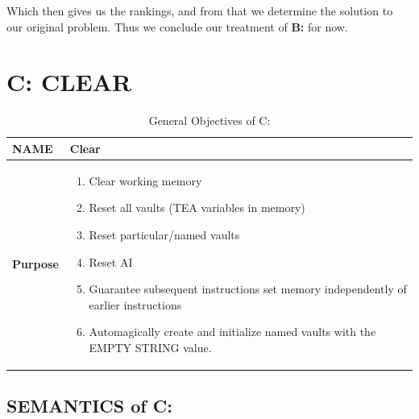 \documentclass[a4paper, 18pt]{book} %
\begin{document}
Which then gives us the rankings, and from that we determine the solution to our original problem. Thus we conclude our treatment of \textbf{B:} for now.


\chapter{C: CLEAR}
\label{CHAPC}


\begin{table}[H]
  \centering
  \LARGE
	\begin{tabular}[t]{|p{}|p{}}
 
	\textbf{NAME} & Clear\\
	\hline
	\textbf{Purpose} & \begin{enumerate}
	\item Clear working memory
	\item Reset all vaults (TEA variables in memory)
	\item Reset particular/named vaults
	\item Reset AI
	\item Guarantee subsequent instructions set memory independently of earlier instructions
	\item Automagically create and initialize named vaults with the EMPTY STRING value.
	\end{enumerate}\\
	\hline
	              
\end{tabular}
\caption{General Objectives of C:}
  \label{TABTAZC}
\end{table}


\section{SEMANTICS of C:}
\label{SECSEMC}
\end{document}

